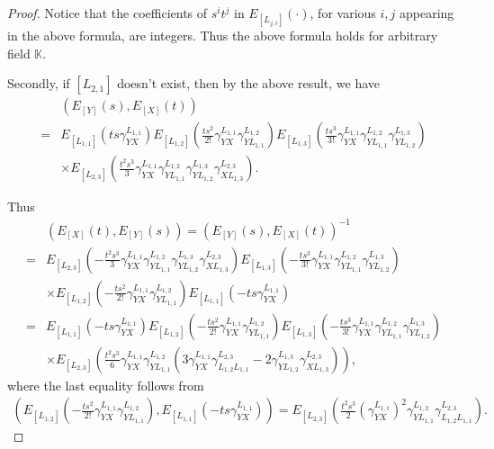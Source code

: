 \documentclass[12pt]{amsart}
\begin{document}
\begin{proof}
   Notice that the coefficients of $s^it^j$ in $E_{[L_{j,i}]}(\cdot)$, for various $i,j$ appearing in the above formula, are integers. 
   Thus the above formula holds for arbitrary field $\mathbb{K}$.





Secondly, if $[L_{2,1}]$ doesn't exist, then by the above result, we have
    \begin{align*}
        &(E_{[Y]}(s),E_{[X]}(t))\\
        =&  E_{[L_{1,1}]}(ts\gamma_{YX}^{L_{1,1}}) E_{[L_{1,2}]}(\frac{ts^2}{2!}\gamma_{YX}^{L_{1,1}}\gamma_{YL_{1,1}}^{L_{1,2}}) E_{[L_{1,3}]}( \frac{ts^3}{3!}\gamma_{YX}^{L_{1,1}}\gamma_{YL_{1,1}}^{L_{1,2}}\gamma_{YL_{1,2}}^{L_{1,3}}) \\
         & \times  E_{[L_{2,3}]}( \frac{t^2 s^3}{3} \gamma_{YX}^{L_{1,1}} \gamma_{YL_{1,1}}^{L_{1,2}} \gamma_{YL_{1,2}}^{L_{1,3}} \gamma_{XL_{1,3}}^{L_{2,3}})     .
    \end{align*}

    Thus
    \begin{align*}
        &(E_{[X]}(t),E_{[Y]}(s)) = (E_{[Y]}(s),E_{[X]}(t))^{-1} \\
       =&  E_{[L_{2,3}]}( -\frac{t^2 s^3}{3} \gamma_{YX}^{L_{1,1}} \gamma_{YL_{1,1}}^{L_{1,2}} \gamma_{YL_{1,2}}^{L_{1,3}} \gamma_{XL_{1,3}}^{L_{2,3}})  E_{[L_{1,3}]}( - \frac{ts^3}{3!}\gamma_{YX}^{L_{1,1}}\gamma_{YL_{1,1}}^{L_{1,2}}\gamma_{YL_{1,2}}^{L_{1,3}}) \\
        & \times E_{[L_{1,2}]}(-\frac{ts^2}{2!}\gamma_{YX}^{L_{1,1}}\gamma_{YL_{1,1}}^{L_{1,2}})  E_{[L_{1,1}]}(-ts\gamma_{YX}^{L_{1,1}}) \\
       =&  E_{[L_{1,1}]}(-ts\gamma_{YX}^{L_{1,1}}) E_{[L_{1,2}]}(-\frac{ts^2}{2!}\gamma_{YX}^{L_{1,1}}\gamma_{YL_{1,1}}^{L_{1,2}}) E_{[L_{1,3}]}( - \frac{ts^3}{3!}\gamma_{YX}^{L_{1,1}}\gamma_{YL_{1,1}}^{L_{1,2}}\gamma_{YL_{1,2}}^{L_{1,3}}) \\
        & \times  E_{[L_{2,3}]}(\frac{t^2 s^3}{6} \gamma_{YX}^{L_{1,1}} \gamma_{YL_{1,1}}^{L_{1,2}}(3\gamma_{YX}^{L_{1,1}} \gamma_{L_{1,2}L_{1,1}}^{L_{2,3}}-2\gamma_{YL_{1,2}}^{L_{1,3}} \gamma_{XL_{1,3}}^{L_{2,3}}  ) ),
    \end{align*}
    where the last equality follows from
    \begin{align*}
        (E_{[L_{1,2}]}(-\frac{ts^2}{2!}\gamma_{YX}^{L_{1,1}}\gamma_{YL_{1,1}}^{L_{1,2}}), E_{[L_{1,1}]}(-ts\gamma_{YX}^{L_{1,1}})) = E_{[L_{2,3}]}(\frac{t^2 s^3}{2}(\gamma_{YX}^{L_{1,1}})^2 \gamma_{YL_{1,1}}^{L_{1,2}} \gamma_{L_{1,2}L_{1,1}}^{L_{2,3}}).
    \end{align*}


\end{proof}
\end{document}
